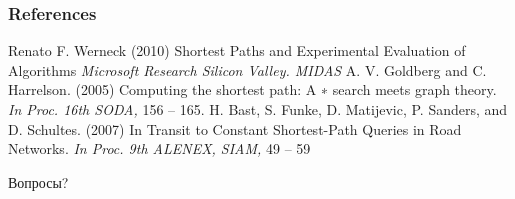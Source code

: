\documentclass{beamer}
\begin{document}

\begin{frame}
\frametitle{References}
\footnotesize{
\begin{thebibliography}{99} %
 Renato F. Werneck (2010)
\newblock Shortest Paths and Experimental Evaluation of Algorithms
\newblock \emph{Microsoft Research Silicon Valley. MIDAS}
 A. V. Goldberg and C. Harrelson. (2005)
\newblock Computing the shortest path: A ∗ search meets graph theory.
\newblock \emph{In Proc. 16th SODA,} 156 -- 165.
 H. Bast, S. Funke, D. Matijevic, P. Sanders, and D. Schultes. (2007)
\newblock In Transit to Constant Shortest-Path Queries in Road Networks. 
\newblock \emph{In Proc. 9th ALENEX, SIAM,} 49 -- 59
\end{thebibliography}
}
\end{frame}



\begin{frame}
\Huge{\centerline{Вопросы?}}
\end{frame}

\end{document}
